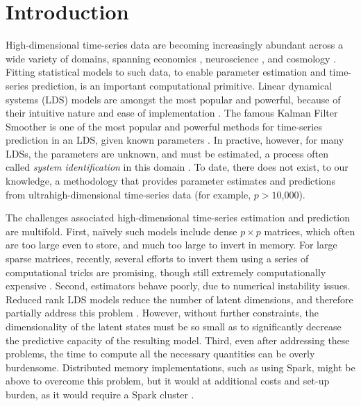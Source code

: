 \documentclass[fleqn,12pt]{article}
\newcommand{\mrsid}{{\sc \texttt{Mr}.~\texttt{Sid}}}
\begin{document}
\section{Introduction}

High-dimensional time-series data are becoming increasingly abundant across a wide variety of domains, spanning economics \citep{Johansen1988}, neuroscience \citep{Friston2003a},   and cosmology \citep{Xie2013a}.
Fitting statistical models to such data, to enable parameter estimation and time-series prediction, is an important computational primitive.
Linear dynamical systems (LDS) models are amongst the most popular and powerful, because of their intuitive nature and ease of implementation \citep{Kalman1963}.   The famous Kalman Filter Smoother is one of the most popular and powerful methods for time-series prediction in an LDS, given known parameters \citep{Kalman1960a}.
In practive, however, for many LDSs, the parameters are unknown, and must be estimated, a process often called \emph{system identification} in this domain \citep{Ljung1998}.  To date, there does not exist, to our knowledge, a methodology that provides parameter estimates and predictions from ultrahigh-dimensional time-series data (for example, $p > 10$,$000$).

The challenges associated high-dimensional time-series estimation and prediction are multifold.  First, na\"{i}vely such models include dense $p \times p$ matrices, which often are too large even to store, and much too large to invert in memory.  For large sparse matrices, recently, several efforts to invert them using a series of computational tricks are promising, though still extremely computationally expensive  \citep{Hsieh2013, Banerjee2013a}.
Second, estimators behave poorly, due to numerical instability issues.
Reduced rank LDS models reduce the number of latent dimensions, and therefore partially address this problem \citep{CHEN1989}.  However, without further constraints, the dimensionality of the latent states must be so small as to significantly decrease the predictive capacity of the resulting model.  Third, even after addressing these problems, the time to compute all the necessary quantities can be overly burdensome. Distributed memory implementations, such as using Spark, might be above to overcome this problem, but it would at additional costs and set-up burden, as it would require a Spark cluster \citep{Zaharia2010}.
\end{document}
